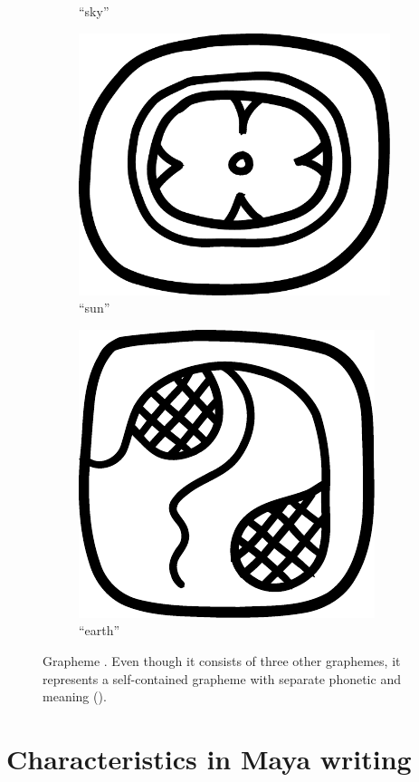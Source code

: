\documentclass[../main.tex]{subfiles}
\begin{document}
\begin{figure}
\begin{subfigure}[b]{0.24\textwidth}
        \caption{ ``sky''}
        \label{fig:terminology-glyphs-chan}
    \end{subfigure}
    \begin{subfigure}[b]{0.24\textwidth}
        \centering
        \includegraphics[height=\glyphblockheight]{img/grapheme-KIN}
        \caption{ ``sun''}
        \label{fig:terminology-glyphs-kin}
    \end{subfigure}
    \begin{subfigure}[b]{0.24\textwidth}
        \centering
        \includegraphics[height=\glyphblockheight]{img/grapheme-KAB}
        \caption{ ``earth''}
        \label{fig:terminology-glyphs-kab}
    \end{subfigure}
    \caption{Grapheme . Even though it consists of three other graphemes, 
             it represents a self-contained grapheme with separate phonetic and meaning 
             (\cite[139]{prager2018}).}
\end{figure}


\section{Characteristics in Maya writing}
\end{document}
